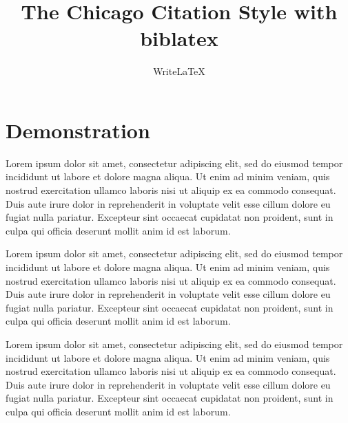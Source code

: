 \documentclass[a4paper]{article}
\begin{document}
\title{The Chicago Citation Style with biblatex}
\author{WriteLaTeX}
\maketitle

\section{Demonstration}

Lorem ipsum dolor sit amet, consectetur adipiscing elit, sed do eiusmod tempor incididunt ut labore et dolore magna aliqua. Ut enim ad minim veniam, quis nostrud exercitation ullamco laboris nisi ut aliquip ex ea commodo consequat. \autocite{Ful83} Duis aute irure dolor in reprehenderit in voluptate velit esse cillum dolore eu fugiat nulla pariatur. Excepteur sint occaecat cupidatat non proident, sunt in culpa qui officia deserunt mollit anim id est laborum. \autocite{GMP81}

Lorem ipsum dolor sit amet, consectetur adipiscing elit, sed do eiusmod tempor incididunt ut labore et dolore magna aliqua. \autocite{GMP81} Ut enim ad minim veniam, quis nostrud exercitation ullamco laboris nisi ut aliquip ex ea commodo consequat.  Duis aute irure dolor in reprehenderit in voluptate velit esse cillum dolore eu fugiat nulla pariatur. Excepteur sint occaecat cupidatat non proident, sunt in culpa qui officia deserunt mollit anim id est laborum.

Lorem ipsum dolor sit amet, consectetur adipiscing elit, sed do eiusmod tempor incididunt ut labore et dolore magna aliqua. Ut enim ad minim veniam, quis nostrud exercitation ullamco laboris nisi ut aliquip ex ea commodo consequat. \autocite{Pat85} Duis aute irure dolor in reprehenderit in voluptate velit esse cillum dolore eu fugiat nulla pariatur. \autocite{PP98,PP95} Excepteur sint occaecat cupidatat non proident, sunt in culpa qui officia deserunt mollit anim id est laborum.

\printbibliography
\end{document}
